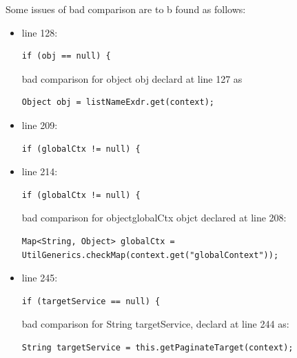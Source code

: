\documentclass{article}
\begin{document}
\begin{flushleft}
Some issues of bad comparison are to b found as follows:\\
\vspace{0.5cm}

\begin{itemize}
\item  line 128:  \\
\vspace{0.5cm}
\begin{lstlisting}
if (obj == null) {
\end{lstlisting}
\vspace{0.5cm}
bad comparison for object obj declard at line 127 as\\
\vspace{0.5cm}
\begin{lstlisting}
Object obj = listNameExdr.get(context);
\end{lstlisting}
\vspace{0.5cm}
\item line 209:  \\
\vspace{0.5cm}
\begin{lstlisting}
if (globalCtx != null) {
\end{lstlisting}
\vspace{0.5cm}
\item line 214: \\
\vspace{0.5cm}
\begin{lstlisting}
if (globalCtx != null) {
\end{lstlisting}
\vspace{0.5cm}
bad comparison for objectglobalCtx objct declared at line  208:\\
\vspace{0.5cm}
\begin{lstlisting}
Map<String, Object> globalCtx = 
UtilGenerics.checkMap(context.get("globalContext"));
\end{lstlisting}
\vspace{0.5cm}



\item line 245: \\
\vspace{0.5cm}
\begin{lstlisting}
if (targetService == null) {
\end{lstlisting}
\vspace{0.5cm}
bad comparison for String targetService, declard at line 244 as:\\
\vspace{0.5cm}
\begin{lstlisting}
String targetService = this.getPaginateTarget(context);
\end{lstlisting}


\end{itemize}
\end{flushleft}
\end{document}
